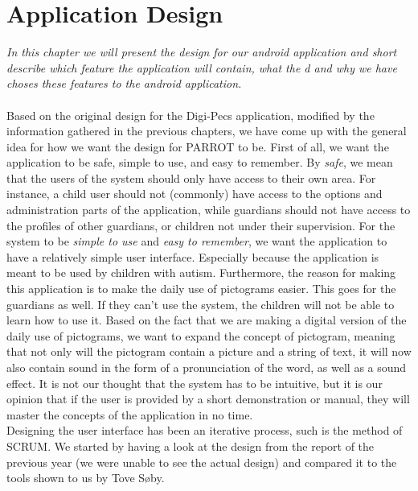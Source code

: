 \chapter{Application Design}
\textit{In this chapter we will present the design for our android application and short describe which feature the application will contain, what the d and why we have choses these features to the android application.}\\
\label{appdes}
\\
Based on the original design for the Digi-Pecs application, modified by the information gathered in the previous chapters, we have come up with the general idea for how we want the design for PARROT to be.\newline
First of all, we want the application to be safe, simple to use, and easy to remember.\newline
By \textit{safe}, we mean that the users of the system should only have access to their own area. For instance, a child user should not (commonly) have access to the options and administration parts of the application, while guardians should not have access to the profiles of other guardians, or children not under their supervision.\newline
For the system to be \textit{simple to use} and \textit{easy to remember}, we want the application to have a relatively simple user interface. Especially because the application is meant to be used by children with autism. Furthermore, the reason for making this application is to make the daily use of pictograms easier. This goes for the guardians as well. If they can't use the system, the children will not be able to learn how to use it.\newline
Based on the fact that we are making a digital version of the daily use of pictograms, we want to expand the concept of pictogram, meaning that not only will the pictogram contain a picture and a string of text, it will now also contain sound in the form of a pronunciation of the word, as well as a sound effect.
It is not our thought that the system has to be intuitive, but it is our opinion that if the user is provided by a short demonstration or manual, they will master the concepts of the application in no time.\newline
\\
Designing the user interface has been an iterative process, such is the method of SCRUM. We started by having a look at the design from the report of the previous year (we were unable to see the actual design) and compared it to the tools shown to us by Tove S\o{}by.%
